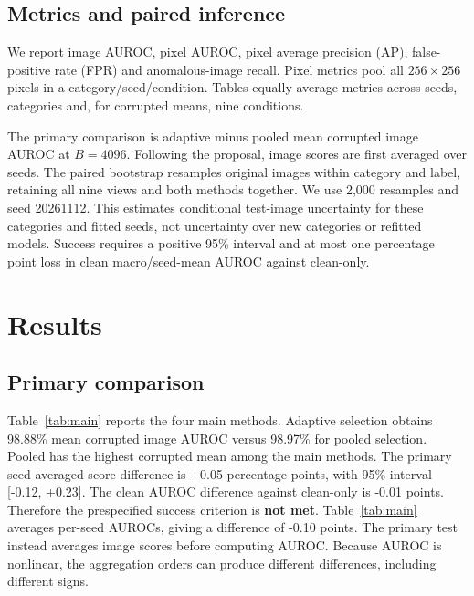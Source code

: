 \documentclass[10pt,twocolumn,letterpaper]{article}
\begin{document}
\subsection{Metrics and paired inference}
We report image AUROC, pixel AUROC, pixel average precision (AP), false-positive rate (FPR) and anomalous-image recall. Pixel metrics pool all $256\times256$ pixels in a category/seed/condition. Tables equally average metrics across seeds, categories and, for corrupted means, nine conditions.

The primary comparison is adaptive minus pooled mean corrupted image AUROC at $B=4096$. Following the proposal, image scores are first averaged over seeds. The paired bootstrap resamples original images within category and label, retaining all nine views and both methods together. We use 2,000 resamples and seed 20261112. This estimates conditional test-image uncertainty for these categories and fitted seeds, not uncertainty over new categories or refitted models. Success requires a positive 95\% interval and at most one percentage point loss in clean macro/seed-mean AUROC against clean-only.

\section{Results}
\subsection{Primary comparison}
Table~\ref{tab:main} reports the four main methods. Adaptive selection obtains 98.88\% mean corrupted image AUROC versus 98.97\% for pooled selection. Pooled has the highest corrupted mean among the main methods. The primary seed-averaged-score difference is +0.05 percentage points, with 95\% interval [-0.12, +0.23]. The clean AUROC difference against clean-only is -0.01 points. Therefore the prespecified success criterion is \textbf{not met}. Table~\ref{tab:main} averages per-seed AUROCs, giving a difference of -0.10 points. The primary test instead averages image scores before computing AUROC. Because AUROC is nonlinear, the aggregation orders can produce different differences, including different signs.
\end{document}

